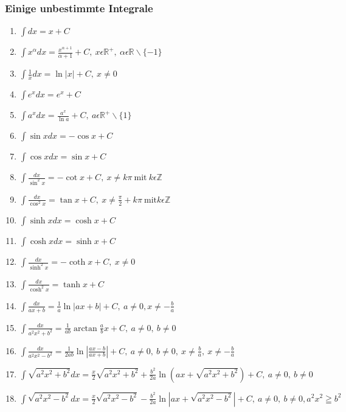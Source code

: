 \subsubsection{Einige unbestimmte Integrale }
\begin{enumerate}
  \item $ \int dx=x+C $
  \item $ \int{x^\alpha}dx=\frac{x^{\alpha+1}}{\alpha+1}+C,\ x \epsilon \mathbb
  R ^+,\ \alpha \epsilon \mathbb R \backslash \{ -1 \} $
  \item $ \int{\frac{1}{x}}dx=\ln \left| x \right| + C,\ x\neq0 $
  \item $ \int{e^x}dx=e^x+C $
  \item $ \int{a^x}dx=\frac{a^x}{\ln{a}}+C,\ a \epsilon \mathbb
  R^+\backslash\{1\} $
  \item $ \int{ \sin{x}} dx = -\cos{x} + C $
  \item $ \int{\cos{x}} dx = \sin{x} + C $
  \item $ \int{\frac{dx}{\sin^2x}}=-\cot{x}+C,\ x\neq k\pi\ \mathrm{mit}\ k
  \epsilon \mathbb Z $
  \item $ \int{\frac{dx}{\cos^2x}}=\tan{x}+C,\ x\neq\frac{\pi}{2}+k\pi\
  \mathrm{mit} k \epsilon \mathbb Z $
  \item $ \int{\sinh{x}}dx = \cosh{x}+C $
  \item $ \int{\cosh{x}}dx = \sinh{x}+C $
  \item $ \int{\frac{dx}{\sinh^2x}}=-\coth{x}+C,\ x\neq0 $
  \item $ \int{\frac{dx}{\cosh^2x}}=\tanh{x}+C $
  \item $ \int{\frac{dx}{ax+b}} = \frac{1}{a}\ln \left|ax + b\right| + C,\
  a\neq 0,x\neq-\frac{b}{a} $
  \item $ \int{\frac{dx}{a^2x^2+b^2}}=\frac{1}{ab}\arctan{\frac{a}{b}x}+C,\
  a\neq0,\ b\neq0 $
  \item $
  \int{\frac{dx}{a^2x^2-b^2}}=\frac{1}{2ab}\ln{\left|\frac{ax-b}{ax+b}\right|}+C,\ a\neq0,\ b\neq0,\ x\neq\frac{b}{a},\ x\neq-\frac{b}{a} $
  \item $
  \int{\sqrt{a^2x^2+b^2}}dx=\frac{x}{2}\sqrt{a^2x^2+b^2}+\frac{b^2}{2a}\ln{(ax+\sqrt{a^2x^2+b^2})}+C,\
  a\neq0,\ b\neq0 $
  \item $
  \int{\sqrt{a^2x^2-b^2}}dx=\frac{x}{2}\sqrt{a^2x^2-b^2}-\frac{b^2}{2a}\ln\left|ax+\sqrt{a^2x^2-b^2}\right|+C,\
  a\neq0,\ b\neq0,a^2x^2\geqq b^2$
\end{enumerate}



